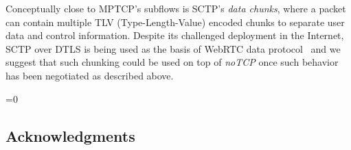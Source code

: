 \documentclass{sig-alternate-10pt}
\def\anon{1}        %
\begin{document}
Conceptually close to MPTCP's subflows is SCTP's \emph{data chunks}, where a packet can contain multiple TLV (Type-Length-Value) encoded chunks to separate user data and control information. Despite its challenged deployment in the Internet, SCTP over DTLS is being used as the basis of WebRTC data protocol~\cite{Tuexen:wv} and we suggest that such chunking could be used on top of \emph{noTCP} once such behavior has been negotiated as described above.


%

\ifnum\anon=0
\subsection*{Acknowledgments}

\fi



{\footnotesize 


}

%
\end{document}
